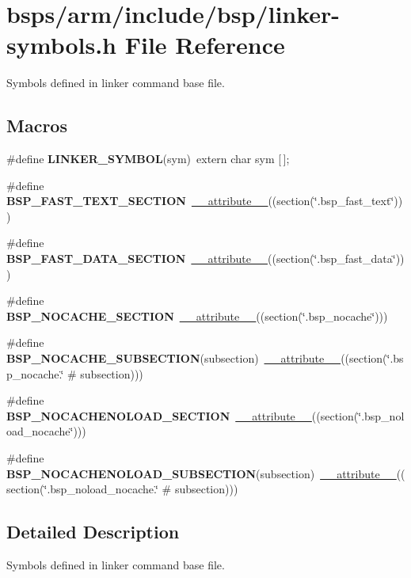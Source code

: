 \hypertarget{arm_2include_2bsp_2linker-symbols_8h}{}\section{bsps/arm/include/bsp/linker-\/symbols.h File Reference}
\label{arm_2include_2bsp_2linker-symbols_8h}


Symbols defined in linker command base file.  


\subsection*{Macros}
\begin{DoxyCompactItemize}
\item 
\#define {\bfseries L\+I\+N\+K\+E\+R\+\_\+\+S\+Y\+M\+B\+OL}(sym)~extern char sym \mbox{[}$\,$\mbox{]};
\item 
\#define {\bfseries B\+S\+P\+\_\+\+F\+A\+S\+T\+\_\+\+T\+E\+X\+T\+\_\+\+S\+E\+C\+T\+I\+ON}~\mbox{\hyperlink{struct____attribute____}{\+\_\+\+\_\+attribute\+\_\+\+\_\+}}((section(\char`\"{}.bsp\+\_\+fast\+\_\+text\char`\"{})))
\item 
\#define {\bfseries B\+S\+P\+\_\+\+F\+A\+S\+T\+\_\+\+D\+A\+T\+A\+\_\+\+S\+E\+C\+T\+I\+ON}~\mbox{\hyperlink{struct____attribute____}{\+\_\+\+\_\+attribute\+\_\+\+\_\+}}((section(\char`\"{}.bsp\+\_\+fast\+\_\+data\char`\"{})))
\item 
\#define {\bfseries B\+S\+P\+\_\+\+N\+O\+C\+A\+C\+H\+E\+\_\+\+S\+E\+C\+T\+I\+ON}~\mbox{\hyperlink{struct____attribute____}{\+\_\+\+\_\+attribute\+\_\+\+\_\+}}((section(\char`\"{}.bsp\+\_\+nocache\char`\"{})))
\item 
\#define {\bfseries B\+S\+P\+\_\+\+N\+O\+C\+A\+C\+H\+E\+\_\+\+S\+U\+B\+S\+E\+C\+T\+I\+ON}(subsection)~\mbox{\hyperlink{struct____attribute____}{\+\_\+\+\_\+attribute\+\_\+\+\_\+}}((section(\char`\"{}.bsp\+\_\+nocache.\char`\"{} \# subsection)))
\item 
\#define {\bfseries B\+S\+P\+\_\+\+N\+O\+C\+A\+C\+H\+E\+N\+O\+L\+O\+A\+D\+\_\+\+S\+E\+C\+T\+I\+ON}~\mbox{\hyperlink{struct____attribute____}{\+\_\+\+\_\+attribute\+\_\+\+\_\+}}((section(\char`\"{}.bsp\+\_\+noload\+\_\+nocache\char`\"{})))
\item 
\#define {\bfseries B\+S\+P\+\_\+\+N\+O\+C\+A\+C\+H\+E\+N\+O\+L\+O\+A\+D\+\_\+\+S\+U\+B\+S\+E\+C\+T\+I\+ON}(subsection)~\mbox{\hyperlink{struct____attribute____}{\+\_\+\+\_\+attribute\+\_\+\+\_\+}}((section(\char`\"{}.bsp\+\_\+noload\+\_\+nocache.\char`\"{} \# subsection)))
\end{DoxyCompactItemize}


\subsection{Detailed Description}
Symbols defined in linker command base file. 


